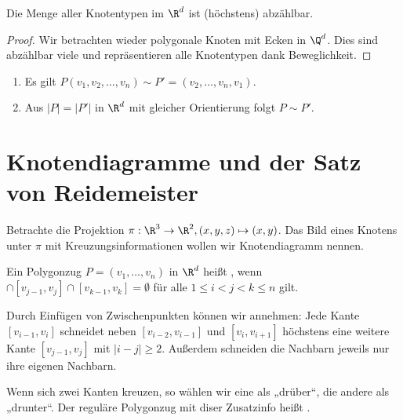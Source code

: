 
\begin{kor}
    Die Menge aller Knotentypen im $\R^d$ ist (höchstens) abzählbar.
    \begin{proof}
        Wir betrachten wieder polygonale Knoten mit Ecken in $\Q^d$.
        Dies sind abzählbar viele und repräsentieren alle Knotentypen dank Beweglichkeit.
    \end{proof}
\end{kor}

\begin{note}
    \begin{enumerate}[(1)]
        \item
            Es gilt $P(v_1, v_2, \dotsc, v_n) \sim P' = (v_2, \dotsc, v_n, v_1)$.
        \item
            Aus $|P| = |P'|$ in $\R^d$ mit gleicher Orientierung folgt $P \sim P'$.
    \end{enumerate}
\end{note}


\section{Knotendiagramme und der Satz von Reidemeister}


Betrachte die Projektion $\pi: \R^3 \to \R^2, (x,y,z) \mapsto (x,y)$.
Das Bild eines Knotens unter $\pi$ mit Kreuzungsinformationen wollen wir Knotendiagramm nennen.

\begin{df}
    Ein Polygonzug $P = (v_1, \dotsc, v_n)$ in $\R^d$ heißt , wenn
    \begin{math}
        [v_{i-1},v_i] \cap [v_{j-1},v_j] \cap [v_{k-1}, v_{k}] = \emptyset
    \end{math}
    für alle $1 \le i < j < k \le n$ gilt.
\end{df}

\begin{note}
    Durch Einfügen von Zwischenpunkten können wir annehmen:
    Jede Kante $[v_{i-1}, v_i]$ schneidet neben $[v_{i-2}, v_{i-1}]$ und $[v_{i},v_{i+1}]$ höchstens eine weitere Kante $[v_{j-1},v_j]$ mit $|i-j| \ge 2$.
    Außerdem schneiden die Nachbarn jeweils nur ihre eigenen Nachbarn.

    Wenn sich zwei Kanten kreuzen, so wählen wir eine als „drüber“, die andere als „drunter“.
    Der reguläre Polygonzug mit diser Zusatzinfo heißt .
\end{note}


